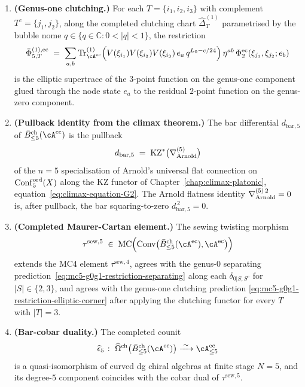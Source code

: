 \begin{theorem}
\begin{enumerate}[label=\textup{(\roman*)}]
\item \textbf{(Genus-one clutching.)} For each
$T=\{i_{1},i_{2},i_{3}\}$ with complement
$T^c=\{j_{1},j_{2}\}$, along the completed clutching chart
$\widehat{\Delta}^{(1)}_{T}$ parametrised by the bubble nome
$q \in \{q \in \mathbb{C}:0<|q|<1\}$,
the restriction
\begin{equation}
\label{eq:mc5-g0g1-restriction-elliptic-corner}
\bar\Phi^{(1),\evcore}_{5,T}
\;=\;
\sum_{a, b}
\mathrm{Tr}^{(1)}_{\cA^{\evcore}}\Bigl(V(\xi_{i_{1}}) V(\xi_{i_{2}}) V(\xi_{i_{3}}) \, e_{a} \, q^{L_{0} - c/24}\Bigr)
\,\eta^{ab}\,
\Phi^{\evcore}_{2}(\xi_{j_{1}}, \xi_{j_{2}}; e_{b})
\end{equation}
is the elliptic supertrace of the $3$-point function on the genus-one
component glued through the node state $e_a$ to the residual
$2$-point function on the genus-zero component.

\item \textbf{(Pullback identity from the climax theorem.)} The bar
differential $d_{\mathrm{bar}, 5}$ of $\BarOrd_{\le 5}(\cA^{\evcore})$
is the pullback
\begin{equation}
\label{eq:mc5-g0g1-bar-differential-as-pullback}
d_{\mathrm{bar}, 5} \;=\; \mathrm{KZ}^{*}\bigl(\nabla^{(5)}_{\mathrm{Arnold}}\bigr)
\end{equation}
of the $n = 5$ specialisation of Arnold's universal flat connection on
$\mathrm{Conf}^{\mathrm{ord}}_{5}(X)$ along the KZ functor of
Chapter~\ref{chap:climax-platonic}, equation~\eqref{eq:climax-equation-G2}.
The Arnold flatness identity $\nabla^{(5)\, 2}_{\mathrm{Arnold}} = 0$ is, after
pullback, the bar squaring-to-zero $d_{\mathrm{bar}, 5}^{\, 2} = 0$.

\item \textbf{(Completed Maurer-Cartan element.)} The sewing twisting
morphism
\begin{equation}
\label{eq:mc5-g0g1-completed-mc-element}
\tau^{\mathrm{sew}, 5}
\;\in\;
\MC\Bigl(\Conv\bigl(\BarOrd_{\le 5}(\cA^{\evcore}), \cA^{\evcore}\bigr)\Bigr)
\end{equation}
extends the MC4 element $\tau^{\mathrm{sew}, 4}$, agrees with the
genus-$0$ separating prediction~\eqref{eq:mc5-g0g1-restriction-separating}
along each $\delta_{0|S, S^c}$ for $|S| \in \{2, 3\}$, and agrees with
the genus-one clutching prediction
\eqref{eq:mc5-g0g1-restriction-elliptic-corner} after applying the
clutching functor for every $T$ with $|T|=3$.

\item \textbf{(Bar-cobar duality.)} The completed counit
\begin{equation}
\label{eq:mc5-g0g1-bar-cobar-counit}
\widehat{\epsilon}_{5} \;\colon\;
\widehat{\Omega}^{\mathrm{ch}}\bigl(\BarOrd_{\le 5}(\cA^{\evcore})\bigr)
\xrightarrow{\;\sim\;}
\cA^{\evcore}_{\le 5}
\end{equation}
is a quasi-isomorphism of curved dg chiral algebras at finite stage
$N = 5$, and its degree-$5$ component coincides with the cobar dual of
$\tau^{\mathrm{sew}, 5}$.
\end{enumerate}
\end{theorem}

